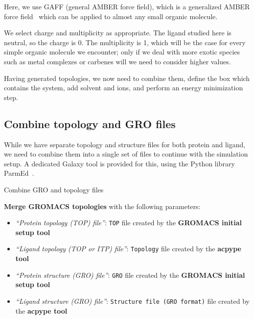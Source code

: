 \documentclass[twocolumn]{bmcart}%
\providecommand{\tightlist}{%
  \setlength{\itemsep}{0pt}\setlength{\parskip}{0pt}}
\begin{document}
Here, we use GAFF (general AMBER force field), which is a generalized AMBER force field~\cite{Wang2004} which can be applied to almost any small organic molecule.

We select charge and multiplicity as appropriate. The ligand studied here is neutral, so the charge is 0. The multiplicity is 1, which will be the case for every simple organic molecule we encounter; only if we deal with more exotic species such as metal complexes or carbenes will we need to consider higher values.


Having generated topologies, we now need to combine them, define the box
which contains the system, add solvent and ions, and perform an energy
minimization step.

\subsection*{Combine topology and GRO
files}\label{combine-topology-and-gro-files}

While we have separate topology and structure files for both protein and ligand, we need to combine them into a single set of files to continue with the simulation setup. A dedicated Galaxy tool is provided for this, using the Python library ParmEd~\cite{Swails2016}.

\begin{handson_box_colour}{Combine GRO and topology files}

  \textbf{Merge GROMACS topologies} with the following
  parameters:

  \begin{itemize}
  \tightlist
  \item
    \emph{``Protein topology (TOP) file''}: \texttt{TOP} file created by the \textbf{GROMACS initial setup tool}
  \item
    \emph{``Ligand topology (TOP or ITP) file''}: \texttt{Topology} file created by the \textbf{acpype tool}
  \item
    \emph{``Protein structure (GRO) file''}: \texttt{GRO} file created by the \textbf{GROMACS initial setup tool}
  \item
    \emph{``Ligand structure (GRO) file''}: \texttt{Structure file (GRO format)} file created by the \textbf{acpype tool}

  \end{itemize}

\end{handson_box_colour}
\end{document}
